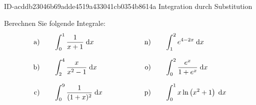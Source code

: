 \begin{exercise}
      {ID-acddb23046b69adde4519a433041cb0354b8614a}
      {Integration durch Substitution}
  \ifproblem\problem\par
    Berechnen Sie folgende Integrale:
    \begingroup
      \allowdisplaybreaks
      \newcommand{\da}{\;\mathrm{d}a}
      \newcommand{\dt}{\;\mathrm{d}t}
      \newcommand{\dx}{\;\mathrm{d}x}
      \newcommand{\separator}{\qquad&\qquad}%
      \newcommand{\vstrut}{\rule[-3.5ex]{0pt}{7.5ex}}%
      \newcommand{\exca}{&\int_{0}^{1}\frac{1}{x+1}\dx}%
      \newcommand{\excb}{&\int_{2}^{4}\frac{x}{x^{2}-1}\dx}%
      \newcommand{\excc}{&\int_{0}^{9}\frac{1}{(1+x)^{2}}\dx}%
      \newcommand{\excd}{&\int_{2}^{3}\frac{11x-4}{x-1}\dx}%
      \newcommand{\exce}{&\int_{0}^{1}\frac{4x-10}{\left(x^{2}-5x+6\right)^{2}}\dx}%
      \newcommand{\excf}{&\int_{0}^{\frac{1}{2}}\frac{2x}{x^{4}-2x^{2}+1}\dx}%
      \newcommand{\excg}{&\int_{0}^{1}\frac{x^{2}+t}{x+t}\dx}%
      \newcommand{\exch}{&\int_{-1}^{1}\frac{t^{2}-1}{t^{2}}x\dx}%
      \newcommand{\exci}{&\int_{0}^{1}x-\frac{2tx}{x^{2}+t}\dx}%
      \newcommand{\excj}{&\int_{0}^{1}e^{3x+1}\dx}%
      \newcommand{\exck}{&\int_{0}^{3}2xe^{x^{2}-2}\dx}%
      \newcommand{\excl}{&\int_{0}^{5}e^{-x}\dx}%
      \newcommand{\excm}{&\int_{-3}^{0}e^{1-x}\dx}%
      \newcommand{\excn}{&\int_{1}^{2}e^{4-2x}\dx}%
      \newcommand{\exco}{&\int_{0}^{2}\frac{e^{x}}{1+e^{x}}\dx}%
      \newcommand{\excp}{&\int_{0}^{1}x\ln\left(x^{2}+1\right)\dx}%
      \newcommand{\excq}{&\int_{2}^{3}\frac{\left(\ln x\right)^{2}}{x}\dx}%
      \newcommand{\excr}{&\int_{1}^{2}\frac{\sqrt{\ln x}}{x}\dx}%
      \newcommand{\excs}{&\int_{e}^{2e}\frac{\ln x}{x}\dx}%
      \newcommand{\exct}{&\int_{0}^{1}\frac{\ln(x+1)}{x+1}\dx}%
      \newcommand{\excu}{&\int_{0}^{1}\frac{x}{\sqrt{2+x^{2}}}\dx}%
      \newcommand{\excv}{&\int_{0}^{\pi}\sin(3-7x)\dx}%
      \newcommand{\excw}{&\int_{0}^{\frac{\pi}{2}}\sin^{3}x\cos x\dx}%
      \newcommand{\excx}{&\int_{0}^{\pi}\cos^{3}x\sin x\dx}%
      \newcommand{\excy}{&\int_{-\frac{\pi}{2}}^{\frac{\pi}{2}}\tan(x)\dx}%
      \newcommand{\excz}{&\int_{0}^{\pi}\cos\left(\sqrt{x}\right)\dx}%
      \begin{alignat*}{5}
        \text{a)\vstrut}&\quad & \exca & \separator & \text{n)\vstrut}&\quad & \excn \\
        \text{b)\vstrut}&\quad & \excb & \separator & \text{o)\vstrut}&\quad & \exco \\
        \text{c)\vstrut}&\quad & \excc & \separator & \text{p)\vstrut}&\quad & \excp \\

\end{alignat*}
\end{exercise}
